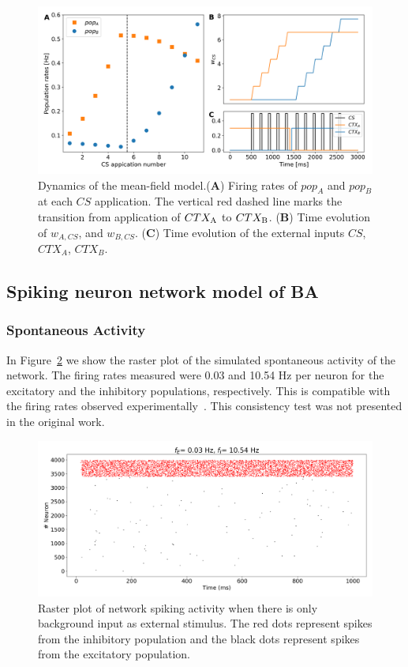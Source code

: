 \begin{figure}[!ht]
\centering
\includegraphics[width=1\textwidth]{figures/result_mean_field_model.png}
\caption{Dynamics of the mean-field model.(\textbf{A}) Firing rates of $pop_A$ and $pop_B$ at each $CS$ application. The vertical red dashed line marks the transition from application of $CTX_{\rm A}$ to $CTX_{\rm B}$. (\textbf{B}) Time evolution of $w_{A,CS}$, and $w_{B,CS}$. (\textbf{C}) Time evolution of the external inputs $CS$, $CTX_{A}$, $CTX_{B}$. \label{fig:rate_model_result}}
\end{figure}
\FloatBarrier

\subsection*{Spiking neuron network model of BA}

\subsubsection{Spontaneous Activity}

In Figure~\ref{fig:BKG} we show the raster plot of the simulated spontaneous activity of the network. The firing rates measured were 0.03 and 10.54 Hz per neuron for the excitatory and the inhibitory populations, respectively. This is compatible with the firing rates observed experimentally~\cite{sah2003amygdaloid}. This consistency test was not presented in the original work.

\begin{figure}[!ht]
\centering
\includegraphics[width=1.0\textwidth]{figures/BKG_raster_plot.png}
\caption{\label{fig:BKG} Raster plot of network spiking activity when there is only background input as external stimulus. The red dots represent spikes from the inhibitory population and the black dots represent spikes from the excitatory population.}
\end{figure}
\FloatBarrier

